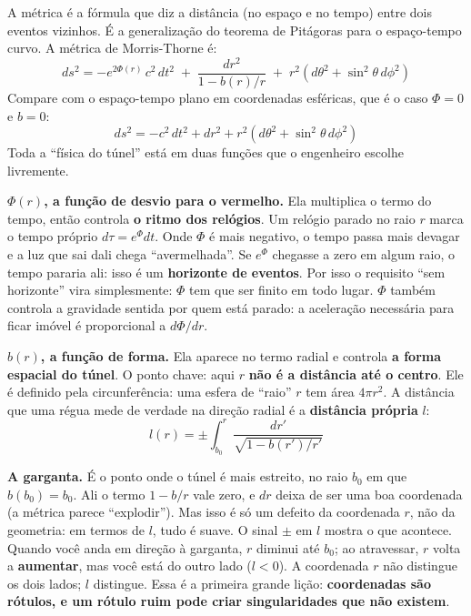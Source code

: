 \documentclass[11pt,a4paper]{article}
\begin{document}
A métrica é a fórmula que diz a distância (no espaço e no tempo) entre dois eventos vizinhos. É a generalização do
teorema de Pitágoras para o espaço-tempo curvo. A métrica de Morris-Thorne é:
\begin{equation}
ds^2 = -e^{2\Phi(r)}\,c^2\,dt^2 \;+\; \frac{dr^2}{1 - b(r)/r} \;+\; r^2\left(d\theta^2 + \sin^2\theta\,d\phi^2\right)
\label{eq:metrica}
\end{equation}
Compare com o espaço-tempo plano em coordenadas esféricas, que é o caso $\Phi = 0$ e $b = 0$:
\begin{equation*}
ds^2 = -c^2\,dt^2 + dr^2 + r^2\left(d\theta^2 + \sin^2\theta\,d\phi^2\right)
\end{equation*}
Toda a ``física do túnel'' está em duas funções que o engenheiro escolhe livremente.

\textbf{$\Phi(r)$, a função de desvio para o vermelho.} Ela multiplica o termo do tempo, então controla \textbf{o ritmo
dos relógios}. Um relógio parado no raio $r$ marca o tempo próprio $d\tau = e^{\Phi}dt$. Onde $\Phi$ é mais negativo,
o tempo passa mais devagar e a luz que sai dali chega ``avermelhada''. Se $e^{\Phi}$ chegasse a zero em algum raio, o
tempo pararia ali: isso é um \textbf{horizonte de eventos}. Por isso o requisito ``sem horizonte'' vira
simplesmente: $\Phi$ tem que ser finito em todo lugar. $\Phi$ também controla a gravidade sentida por quem está parado:
a aceleração necessária para ficar imóvel é proporcional a $d\Phi/dr$.

\textbf{$b(r)$, a função de forma.} Ela aparece no termo radial e controla \textbf{a forma espacial do túnel}. O ponto
chave: aqui $r$ \textbf{não é a distância até o centro}. Ele é definido pela circunferência: uma esfera de ``raio''
$r$ tem área $4\pi r^2$. A distância que uma régua mede de verdade na direção radial é a \textbf{distância própria} $l$:
\begin{equation}
l(r) = \pm \int_{b_0}^{r} \frac{dr'}{\sqrt{1 - b(r')/r'}}
\end{equation}

\textbf{A garganta.} É o ponto onde o túnel é mais estreito, no raio $b_0$ em que $b(b_0) = b_0$. Ali o termo
$1 - b/r$ vale zero, e $dr$ deixa de ser uma boa coordenada (a métrica parece ``explodir''). Mas isso é só um defeito
da coordenada $r$, não da geometria: em termos de $l$, tudo é suave. O sinal $\pm$ em $l$ mostra o que acontece.
Quando você anda em direção à garganta, $r$ diminui até $b_0$; ao atravessar, $r$ volta a \textbf{aumentar}, mas você
está do outro lado ($l < 0$). A coordenada $r$ não distingue os dois lados; $l$ distingue. Essa é a primeira grande
lição: \textbf{coordenadas são rótulos, e um rótulo ruim pode criar singularidades que não existem}.
\end{document}
